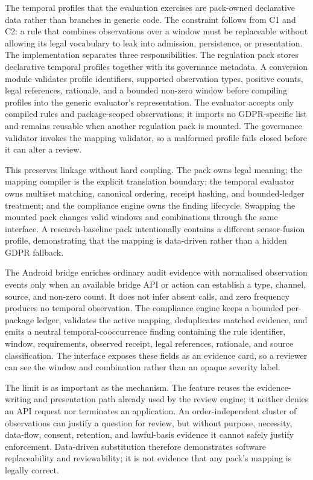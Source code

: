 The temporal profiles that the evaluation exercises are pack-owned declarative data rather than branches in generic code. The constraint follows from C1 and C2: a rule that combines observations over a window must be replaceable without allowing its legal vocabulary to leak into admission, persistence, or presentation. The implementation separates three responsibilities. The regulation pack stores declarative temporal profiles together with its governance metadata. A conversion module validates profile identifiers, supported observation types, positive counts, legal references, rationale, and a bounded non-zero window before compiling profiles into the generic evaluator's representation. The evaluator accepts only compiled rules and package-scoped observations; it imports no GDPR-specific list and remains reusable when another regulation pack is mounted. The governance validator invokes the mapping validator, so a malformed profile fails closed before it can alter a review.

This preserves linkage without hard coupling. The pack owns legal meaning; the mapping compiler is the explicit translation boundary; the temporal evaluator owns multiset matching, canonical ordering, receipt hashing, and bounded-ledger treatment; and the compliance engine owns the finding lifecycle. Swapping the mounted pack changes valid windows and combinations through the same interface. A research-baseline pack intentionally contains a different sensor-fusion profile, demonstrating that the mapping is data-driven rather than a hidden GDPR fallback.

The Android bridge enriches ordinary audit evidence with normalised observation events only when an available bridge API or action can establish a type, channel, source, and non-zero count. It does not infer absent calls, and zero frequency produces no temporal observation. The compliance engine keeps a bounded per-package ledger, validates the active mapping, deduplicates matched evidence, and emits a neutral temporal-cooccurrence finding containing the rule identifier, window, requirements, observed receipt, legal references, rationale, and source classification. The interface exposes these fields as an evidence card, so a reviewer can see the window and combination rather than an opaque severity label.

The limit is as important as the mechanism. The feature reuses the evidence-writing and presentation path already used by the review engine; it neither denies an API request nor terminates an application. An order-independent cluster of observations can justify a question for review, but without purpose, necessity, data-flow, consent, retention, and lawful-basis evidence it cannot safely justify enforcement. Data-driven substitution therefore demonstrates software replaceability and reviewability; it is not evidence that any pack's mapping is legally correct.

